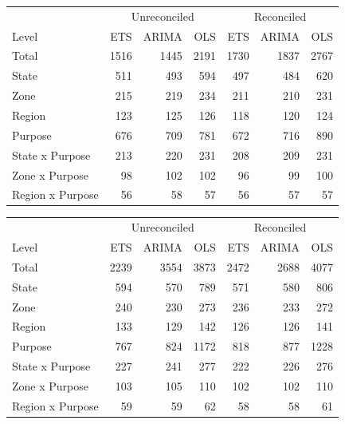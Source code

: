 \documentclass[11pt,a4paper,]{article}
\let\origtable\table
\let\endorigtable\endtable
\renewenvironment{table}[1][2] {
    \expandafter\origtable\expandafter[!htbp]
} {
    \endorigtable
}
\begin{document}
\begin{table}[!h]

\caption{\label{tab:Tourismdataresulrolling}Mean(RMSE) on 2 year test set for ETS, ARIMA and OLS with and without reconciliation - Rolling origin - Tourism dataset.}
\centering
\begin{tabular}[t]{lrrrrrr}
\toprule
\multicolumn{1}{c}{} & \multicolumn{3}{c}{Unreconciled} & \multicolumn{3}{c}{Reconciled} \\
\cmidrule(l{3pt}r{3pt}){2-4} \cmidrule(l{3pt}r{3pt}){5-7}
Level & ETS & ARIMA & OLS & ETS & ARIMA & OLS\\
\midrule
Total & 1516 & 1445 & 2191 & 1730 & 1837 & 2767\\
State & 511 & 493 & 594 & 497 & 484 & 620\\
Zone & 215 & 219 & 234 & 211 & 210 & 231\\
Region & 123 & 125 & 126 & 118 & 120 & 124\\
Purpose & 676 & 709 & 781 & 672 & 716 & 890\\
State x Purpose & 213 & 220 & 231 & 208 & 209 & 231\\
Zone x Purpose & 98 & 102 & 102 & 96 & 99 & 100\\
Region x Purpose & 56 & 58 & 57 & 56 & 57 & 57\\
\bottomrule
\end{tabular}
\end{table}

\begin{table}

\caption{\label{tab:TourismdataresultRMSE}Mean(RMSE) on 2 year test set for ETS, ARIMA and OLS with and without reconciliation - Fixed origin - Tourism dataset.}
\centering
\begin{tabular}[t]{lrrrrrr}
\toprule
\multicolumn{1}{c}{} & \multicolumn{3}{c}{Unreconciled} & \multicolumn{3}{c}{Reconciled} \\
\cmidrule(l{3pt}r{3pt}){2-4} \cmidrule(l{3pt}r{3pt}){5-7}
Level & ETS & ARIMA & OLS & ETS & ARIMA & OLS\\
\midrule
Total & 2239 & 3554 & 3873 & 2472 & 2688 & 4077\\
State & 594 & 570 & 789 & 571 & 580 & 806\\
Zone & 240 & 230 & 273 & 236 & 233 & 272\\
Region & 133 & 129 & 142 & 126 & 126 & 141\\
Purpose & 767 & 824 & 1172 & 818 & 877 & 1228\\
State x Purpose & 227 & 241 & 277 & 222 & 226 & 276\\
Zone x Purpose & 103 & 105 & 110 & 102 & 102 & 110\\
Region x Purpose & 59 & 59 & 62 & 58 & 58 & 61\\
\bottomrule
\end{tabular}
\end{table}
\end{document}

